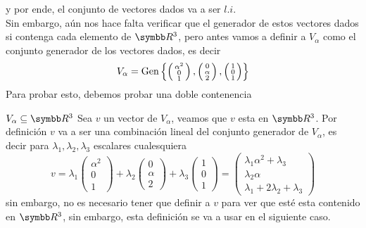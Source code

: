     y por ende, el conjunto de vectores dados va a ser \(l.i\).
    \\
    Sin embargo, aún nos hace falta verificar que el generador de estos vectores dados si contenga cada elemento de \(\realR^3\), 
    pero antes vamos a definir a \(V_\alpha\) como el conjunto generador de los vectores dados, es decir
    \[
        V_\alpha = 
            \text{Gen} \left\{ 
                \left(\begin{smallmatrix}\alpha^2 \\ 0 \\ 1\end{smallmatrix}\right),
                \left(\begin{smallmatrix}0 \\ \alpha \\ 2 \end{smallmatrix}\right),
                \left(\begin{smallmatrix}1 \\ 0 \\ 1\end{smallmatrix}\right)
             \right\}
    \]
    Para probar esto, debemos probar una doble contenencia
    \ResetCases{}
    \begin{mathcase}{{\(V_\alpha \subseteq \realR^3\)}}
        Sea \(v\) un vector de \(V_\alpha\), veamos que \(v\) esta en \(\realR^3\).
        Por definición \(v\) va a ser una combinación lineal del conjunto generador de \(V_\alpha\), es decir 
        para \(\lambda_1, \lambda_2, \lambda_3\) escalares cualesquiera
        \[
            v = 
            \lambda_1
            \begin{pmatrix}
                \alpha^2 \\ 0 \\ 1
            \end{pmatrix}
            +
            \lambda_2
            \begin{pmatrix}
                0 \\ \alpha \\ 2
            \end{pmatrix}
            +
            \lambda_3
            \begin{pmatrix}
                1 \\ 0 \\ 1
            \end{pmatrix}
            =
            \begin{pmatrix}
                \lambda_1\alpha^2 + \lambda_3 \\
                \lambda_2\alpha \\
                \lambda_1 + 2\lambda_2 + \lambda_3
            \end{pmatrix}
        \]
        sin embargo, no es necesario tener que definir a \(v\) para ver que esté esta contenido en \(\realR^3\), sin embargo, esta 
        definición se va a usar en el siguiente caso.
    \end{mathcase}
